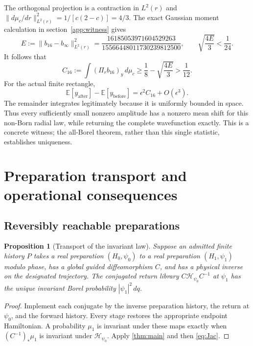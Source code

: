 \documentclass[11pt]{article}
\numberwithin{equation}{section}
\newtheorem{proposition}[proposition]{Proposition}
\theoremstyle{definition}
\newcommand{\calH}{\mathcal H}
\begin{document}
The orthogonal projection is a contraction in $L^2(r)$ and
$\|d\mu_c/dr\|_{L^2(r)}^2=1/[c(2-c)]=4/3$.
The exact Gaussian moment calculation in section~\ref{app:witness} gives
\[
 E:=\|b_{16}-b_\infty\|_{L^2(r)}^2
   =\frac{16185053971604529263}{15566448011730239812500},
 \qquad \sqrt{\frac{4E}{3}}<\frac1{24}.
\]
It follows that
\begin{equation}\label{eq:witnessbound}
 C_{16}:=\int(\Pi_r b_{16})_y\,d\mu_c
       \geq\frac18-\sqrt{\frac{4E}{3}}>\frac1{12}.
\end{equation}
For the actual finite rectangle,
\begin{equation}\label{eq:witness}
 \mathbb E[y_{\mathrm{after}}]-\mathbb E[y_{\mathrm{before}}]
     =\epsilon^2C_{16}+O(\epsilon^3).
\end{equation}
The remainder integrates legitimately because it is uniformly
bounded in space. Thus every sufficiently small nonzero amplitude
has a nonzero mean shift for this non-Born radial law, while
returning the complete wavefunction exactly. This is a concrete
witness; the all-Borel theorem, rather than this single statistic,
establishes uniqueness.

\section{Preparation transport and operational consequences}\label{sec:operational}

\subsection{Reversibly reachable preparations}

\begin{proposition}[Transport of the invariant law]\label{prop:orbit}
Suppose an admitted finite history $P$ takes a real preparation
$(H_0,\psi_0)$ to a real preparation $(H_1,\psi_1)$ modulo phase,
has a global guided diffeomorphism $C$, and has a physical inverse
on the designated trajectory. The conjugated return library
$C\calH_{\psi_0}C^{-1}$ at $\psi_1$ has the unique invariant
Borel probability $|\psi_1|^2\,dq$.
\end{proposition}

\begin{proof}
Implement each conjugate by the inverse preparation history,
the return at $\psi_0$, and the forward history. Every stage
restores the appropriate endpoint Hamiltonian. A probability
$\mu_1$ is invariant under these maps exactly when
$(C^{-1})_*\mu_1$ is invariant under $\calH_{\psi_0}$.
Apply \cref{thm:main} and then \eqref{eq:Jac}.
\end{proof}
\end{document}

